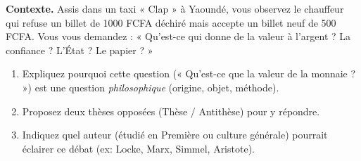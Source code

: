 \documentclass[11pt]{article}
\begin{document}
\begin{exercice}
\textbf{Contexte.} Assis dans un taxi « Clap » à Yaoundé, vous observez le chauffeur qui refuse un billet de 1000 FCFA déchiré mais accepte un billet neuf de 500 FCFA. Vous vous demandez : « Qu'est-ce qui donne de la valeur à l'argent ? La confiance ? L'État ? Le papier ? »
\begin{enumerate}
\item Expliquez pourquoi cette question (« Qu'est-ce que la valeur de la monnaie ? ») est une question \emph{philosophique} (origine, objet, méthode).
\item Proposez deux thèses opposées (Thèse / Antithèse) pour y répondre.
\item Indiquez quel auteur (étudié en Première ou culture générale) pourrait éclairer ce débat (ex: Locke, Marx, Simmel, Aristote).
\end{enumerate}
\end{exercice}
\end{document}
